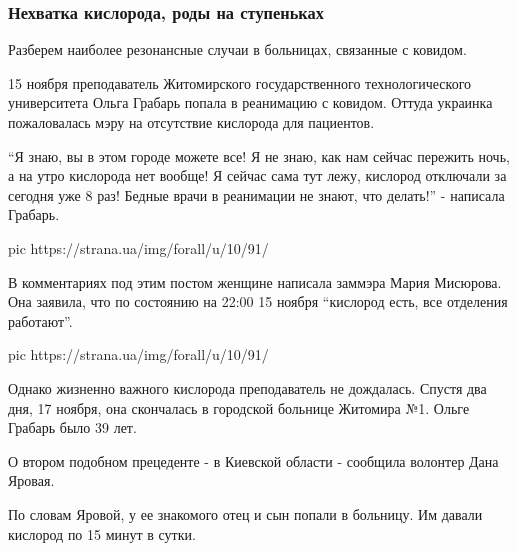  
 
 
 
 

\subsubsection{Нехватка кислорода, роды на ступеньках}
\label{sec:18_11_2020.news.ua.strana.romanova_maria.1.draki_kislorod_kovid.nehvatka_kislorod}

Разберем наиболее резонансные случаи в больницах, связанные с ковидом. 

15 ноября преподаватель Житомирского государственного технологического
университета Ольга Грабарь попала в реанимацию с ковидом. Оттуда украинка
пожаловалась мэру на отсутствие кислорода для пациентов. 

\enquote{Я знаю, вы в этом городе можете все! Я не знаю, как нам сейчас пережить ночь,
а на утро кислорода нет вообще! Я сейчас сама тут лежу, кислород отключали за
сегодня уже 8 раз! Бедные врачи в реанимации не знают, что делать!} - написала
Грабарь.

\ifcmt
pic https://strana.ua/img/forall/u/10/91/%
\fi

В комментариях под этим постом женщине написала заммэра Мария Мисюрова. Она
заявила, что по состоянию на 22:00 15 ноября \enquote{кислород есть, все отделения
работают}. 

\ifcmt
pic https://strana.ua/img/forall/u/10/91/%
\fi

Однако жизненно важного кислорода преподаватель не дождалась. Спустя два дня,
17 ноября, она скончалась в городской больнице Житомира №1. Ольге Грабарь было
39 лет. 


О втором подобном прецеденте  - в Киевской области - сообщила волонтер Дана
Яровая.

По словам Яровой, у ее знакомого отец и сын попали в больницу. Им давали
кислород по 15 минут в сутки.

